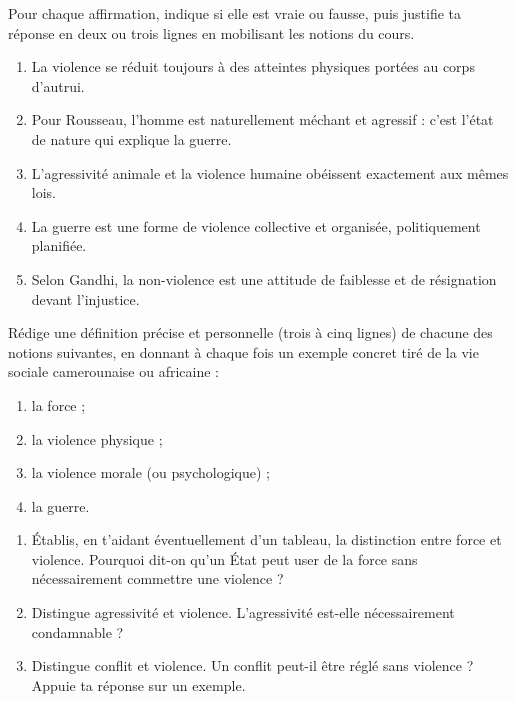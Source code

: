 \documentclass[11pt]{article}
\newcommand{\cle}[1]{{\popxbold\color{popdark}#1}}
\begin{document}
\begin{exercice}
Pour chaque affirmation, indique si elle est vraie ou fausse, puis justifie ta réponse en deux ou trois lignes en mobilisant les notions du cours.

\begin{enumerate}
\item La violence se réduit toujours à des atteintes physiques portées au corps d'autrui.
\item Pour Rousseau, l'homme est naturellement méchant et agressif : c'est l'état de nature qui explique la guerre.
\item L'agressivité animale et la violence humaine obéissent exactement aux mêmes lois.
\item La guerre est une forme de violence collective et organisée, politiquement planifiée.
\item Selon Gandhi, la non-violence est une attitude de faiblesse et de résignation devant l'injustice.
\end{enumerate}
\end{exercice}

\begin{exercice}
Rédige une définition précise et personnelle (trois à cinq lignes) de chacune des notions suivantes, en donnant à chaque fois un exemple concret tiré de la vie sociale camerounaise ou africaine :
\begin{enumerate}
\item la \cle{force} ;
\item la \cle{violence physique} ;
\item la \cle{violence morale} (ou psychologique) ;
\item la \cle{guerre}.
\end{enumerate}
\end{exercice}

\begin{exercice}
\begin{enumerate}
\item Établis, en t'aidant éventuellement d'un tableau, la distinction entre \cle{force} et \cle{violence}. Pourquoi dit-on qu'un État peut user de la force sans nécessairement commettre une violence ?
\item Distingue \cle{agressivité} et \cle{violence}. L'agressivité est-elle nécessairement condamnable ?
\item Distingue \cle{conflit} et \cle{violence}. Un conflit peut-il être réglé sans violence ? Appuie ta réponse sur un exemple.
\end{enumerate}
\end{exercice}
\end{document}
